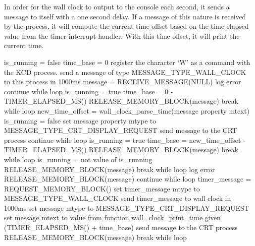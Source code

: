\documentclass[12pt]{report}
\begin{document}
  In order for the wall clock to output to the console each second, it sends a message to itself with a one second delay. If a message of this nature is received by the process, it will compute the current time offset based on the time elapsed value from the timer interrupt handler. With this time offset, it will print the current time.

\begin{algorithmic}
  \State is\_running = false
  \State time\_base = 0
  \State register the character ‘W’ as a command with the KCD process.
  \State send a message of type MESSAGE\_TYPE\_WALL\_CLOCK to this process in 1000ms
    \State message = RECEIVE\_MESSAGE(NULL)
      \State log error
      \State continue while loop
    \EndIf
      \State is\_running = true
      \State time\_base = 0 - TIMER\_ELAPSED\_MS()
      \State RELEASE\_MEMORY\_BLOCK(message)
      \State break while loop
      \State new\_time\_offset = wall\_clock\_parse\_time(message property mtext)
        \State is\_running = false
        \State set message property mtype to MESSAGE\_TYPE\_CRT\_DISPLAY\_REQUEST
        \State send message to the CRT process
        \State continue while loop
      \EndIf
      \State is\_running = true
      \State time\_base = new\_time\_offset - TIMER\_ELAPSED\_MS()
      \State RELEASE\_MEMORY\_BLOCK(message)
      \State break while loop
      \State is\_running = not value of is\_running
            \State RELEASE\_MEMORY\_BLOCK(message)
            \State break while loop
    \Else
        \State log error
        \State RELEASE\_MEMORY\_BLOCK(message)
        \State continue while loop
      \EndIf
      \State timer\_message = REQUEST\_MEMORY\_BLOCK()
      \State set timer\_message mtype to MESSAGE\_TYPE\_WALL\_CLOCK
send timer\_message to wall clock in 1000ms
        \State set message mtype to MESSAGE\_TYPE\_CRT\_DISPLAY\_REQUEST
        \State set message mtext to value from function wall\_clock\_print\_time given (TIMER\_ELAPSED\_MS() + time\_base)
        \State send message to the CRT process
      \Else
        \State RELEASE\_MEMORY\_BLOCK(message)
      \EndIf
      \State break while loop
    \EndIf
  \EndWhile
\EndFunction
\end{algorithmic}
\end{document}
